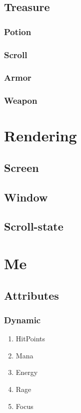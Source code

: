 \documentclass[10pt,oneside,x11names]{article}
\begin{document}
\subsection{Treasure}
\label{sec:orgheadline54}
\subsubsection{Potion}
\label{sec:orgheadline50}
\subsubsection{Scroll}
\label{sec:orgheadline51}
\subsubsection{Armor}
\label{sec:orgheadline52}
\subsubsection{Weapon}
\label{sec:orgheadline53}

\section{Rendering}
\label{sec:orgheadline59}

\subsection{Screen}
\label{sec:orgheadline56}
\subsection{Window}
\label{sec:orgheadline57}
\subsection{Scroll-state}
\label{sec:orgheadline58}

\section{Me}
\label{sec:orgheadline80}

\subsection{Attributes}
\label{sec:orgheadline77}
\subsubsection{Dynamic}
\label{sec:orgheadline65}
\begin{enumerate}
\item HitPoints
\label{sec:orgheadline60}
\item Mana
\label{sec:orgheadline61}
\item Energy
\label{sec:orgheadline62}
\item Rage
\label{sec:orgheadline63}
\item Focus
\label{sec:orgheadline64}
\end{enumerate}
\end{document}
